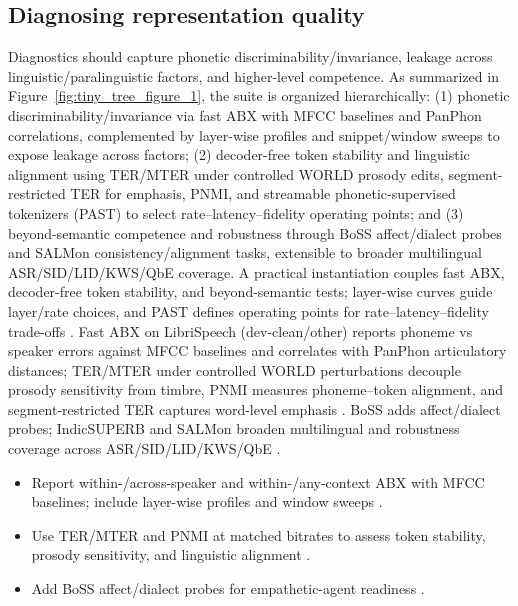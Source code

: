 \documentclass{article}
\begin{document}
\subsection{Diagnosing representation quality} \label{subsec:diagnosingrepresentationquality}
Diagnostics should capture phonetic discriminability/invariance, leakage across linguistic/paralinguistic factors, and higher-level competence. As summarized in Figure~\ref{fig:tiny_tree_figure_1}, the suite is organized hierarchically: (1) phonetic discriminability/invariance via fast ABX with MFCC baselines and PanPhon correlations, complemented by layer-wise profiles and snippet/window sweeps to expose leakage across factors; (2) decoder-free token stability and linguistic alignment using TER/MTER under controlled WORLD prosody edits, segment-restricted TER for emphasis, PNMI, and streamable phonetic-supervised tokenizers (PAST) to select rate--latency--fidelity operating points; and (3) beyond-semantic competence and robustness through BoSS affect/dialect probes and SALMon consistency/alignment tasks, extensible to broader multilingual ASR/SID/LID/KWS/QbE coverage. A practical instantiation couples fast ABX, decoder-free token stability, and beyond-semantic tests; layer-wise curves guide layer/rate choices, and PAST defines operating points for rate--latency--fidelity trade-offs \cite{poli2025fastabxlibraryefficientcomputationabxdis,onda2025benchmarkingprosodyencodingdiscretespeec,har-tuv2025pastphoneticacousticspeechtokenizer,fily2024establishingdegreesclosenessbetweenaudio}. Fast ABX on LibriSpeech (dev-clean/other) reports phoneme vs speaker errors against MFCC baselines and correlates with PanPhon articulatory distances; TER/MTER under controlled WORLD perturbations decouple prosody sensitivity from timbre, PNMI measures phoneme--token alignment, and segment-restricted TER captures word-level emphasis \cite{poli2025fastabxlibraryefficientcomputationabxdis,onda2025benchmarkingprosodyencodingdiscretespeec}. BoSS adds affect/dialect probes; IndicSUPERB and SALMon broaden multilingual and robustness coverage across ASR/SID/LID/KWS/QbE \cite{wang2025bossbeyondsemanticspeech,entry2025indicsuperbspeechprocessinguniversalperf,maimon2025salmonsuiteacousticlanguagemodelevaluati}.

\begin{itemize}
  \item Report within-/across-speaker and within-/any-context ABX with MFCC baselines; include layer-wise profiles and window sweeps \cite{poli2025fastabxlibraryefficientcomputationabxdis,fily2024establishingdegreesclosenessbetweenaudio}.
  \item Use TER/MTER and PNMI at matched bitrates to assess token stability, prosody sensitivity, and linguistic alignment \cite{onda2025benchmarkingprosodyencodingdiscretespeec}.
  \item Add BoSS affect/dialect probes for empathetic-agent readiness \cite{wang2025bossbeyondsemanticspeech}.
\end{itemize}

\end{document}
